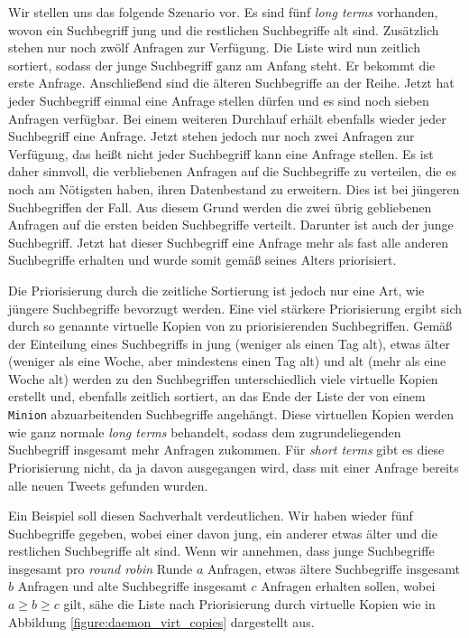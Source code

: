 Wir stellen uns das folgende Szenario vor.
Es sind fünf \textit{long terms} vorhanden, wovon ein Suchbegriff jung und die restlichen Suchbegriffe alt sind.
Zusätzlich stehen nur noch zwölf Anfragen zur Verfügung.
Die Liste wird nun zeitlich sortiert, sodass der junge Suchbegriff ganz am Anfang steht.
Er bekommt die erste Anfrage.
Anschließend sind die älteren Suchbegriffe an der Reihe.
Jetzt hat jeder Suchbegriff einmal eine Anfrage stellen dürfen und es sind noch sieben Anfragen verfügbar.
Bei einem weiteren Durchlauf erhält ebenfalls wieder jeder Suchbegriff eine Anfrage.
Jetzt stehen jedoch nur noch zwei Anfragen zur Verfügung, das heißt nicht jeder Suchbegriff kann eine Anfrage stellen.
Es ist daher sinnvoll, die verbliebenen Anfragen auf die Suchbegriffe zu verteilen, die es noch am Nötigsten haben, ihren Datenbestand zu erweitern.
Dies ist bei jüngeren Suchbegriffen der Fall.
Aus diesem Grund werden die zwei übrig gebliebenen Anfragen auf die ersten beiden Suchbegriffe verteilt.
Darunter ist auch der junge Suchbegriff.
Jetzt hat dieser Suchbegriff eine Anfrage mehr als fast alle anderen Suchbegriffe erhalten und wurde somit gemäß seines Alters priorisiert. 

Die Priorisierung durch die zeitliche Sortierung ist jedoch nur eine Art, wie jüngere Suchbegriffe bevorzugt werden.
Eine viel stärkere Priorisierung ergibt sich durch so genannte virtuelle Kopien von zu priorisierenden Suchbegriffen.
Gemäß der Einteilung eines Suchbegriffs in jung (weniger als einen Tag alt), etwas älter (weniger als eine Woche, aber mindestens einen Tag alt) und alt (mehr als eine Woche alt) werden zu den Suchbegriffen unterschiedlich viele virtuelle Kopien erstellt und, ebenfalls zeitlich sortiert, an das Ende der Liste der von einem \texttt{Minion} abzuarbeitenden Suchbegriffe angehängt.
Diese virtuellen Kopien werden wie ganz normale \textit{long terms} behandelt, sodass dem zugrundeliegenden Suchbegriff insgesamt mehr Anfragen zukommen.
Für \textit{short terms} gibt es diese Priorisierung nicht, da ja davon ausgegangen wird, dass mit einer Anfrage bereits alle neuen Tweets gefunden wurden.

Ein Beispiel soll diesen Sachverhalt verdeutlichen. Wir haben wieder fünf Suchbegriffe gegeben, wobei einer davon jung, ein anderer etwas älter und die restlichen Suchbegriffe alt sind.
Wenn wir annehmen, dass junge Suchbegriffe insgesamt pro \textit{round robin} Runde $a$ Anfragen, etwas ältere Suchbegriffe insgesamt $b$ Anfragen und alte Suchbegriffe insgesamt $c$ Anfragen erhalten sollen, wobei $a \geq b \geq c$ gilt, sähe die Liste nach Priorisierung durch virtuelle Kopien wie in Abbildung \ref{figure:daemon_virt_copies} dargestellt aus.

